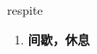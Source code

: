 
\begin{frame}
{\huge respite}
\begin{center}
\begin{enumerate}\Large
  \item \textbf{间歇，休息}
\end{enumerate}
\end{center}
\end{frame}

